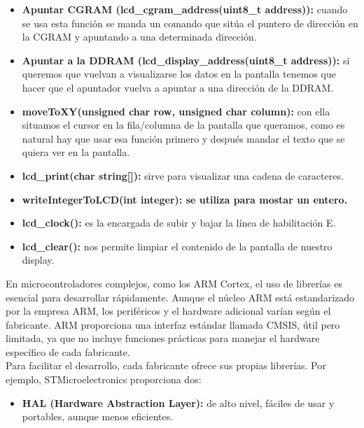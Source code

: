 \documentclass[11pt,a4paper]{article}
\begin{document}
{\begin{itemize}
			\item \textbf{Apuntar CGRAM (lcd\_cgram\_address(uint8\_t address)):} cuando se usa esta función se manda un comando que sitúa el puntero de dirección en la CGRAM y apuntando a una determinada dirección.
			
			\item \textbf{Apuntar a la DDRAM (lcd\_display\_address(uint8\_t address)):} si queremos que vuelvan a visualizarse los datos en la pantalla tenemos que hacer que el apuntador vuelva a apuntar a una dirección de la DDRAM.
			
			\item \textbf{moveToXY(unsigned char row, unsigned char column):} con ella situamos el
			cursor en la fila/columna de la pantalla que queramos, como es natural hay que usar esa función primero y después mandar el texto que se quiera ver en la pantalla.
			
			\item \textbf{lcd\_print(char string[]):} sirve para visualizar una cadena de caracteres.
			
			\item \textbf{writeIntegerToLCD(int integer): se utiliza para mostar un entero.} 
			
			\item \textbf{lcd\_clock():} es la encargada de subir y bajar la línea de habilitación E.

			\item \textbf{lcd\_clear():} nos permite limpiar el contenido de la pantalla de nuestro display.\\
		\end{itemize}
		
		En microcontroladores complejos, como los ARM Cortex, el uso de librerías es esencial para desarrollar rápidamente. Aunque el núcleo ARM está estandarizado por la empresa ARM, los periféricos y el hardware adicional varían según el fabricante. ARM proporciona una interfaz estándar llamada CMSIS, útil pero limitada, ya que no incluye funciones prácticas para manejar el hardware específico de cada fabricante.\\
		
		Para facilitar el desarrollo, cada fabricante ofrece sus propias librerías. Por ejemplo, STMicroelectronics proporciona dos:
				\begin{itemize}
			\item \textbf{HAL (Hardware Abstraction Layer):} de alto nivel, fáciles de usar y portables, aunque menos eficientes.
			

\end{itemize}}
\end{document}
